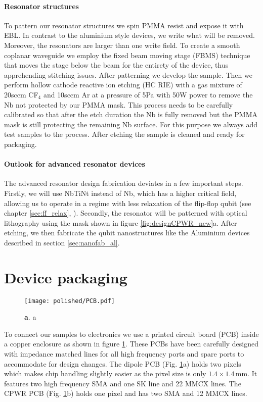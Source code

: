 \paragraph*{Resonator structures}
To pattern our resonator structures we spin PMMA resist and expose it with EBL. In contrast to the aluminium style devices, we write what will be removed. Moreover, the resonators are larger than one write field. To create a smooth coplanar waveguide we employ the fixed beam moving stage (FBMS) technique that moves the stage below the beam for the entirety of the device, thus apprehending stitching issues. After patterning we develop the sample. Then we perform hollow cathode reactive ion etching (HC RIE) with a gas mixture of 20sccm CF$_4$ and 10sccm Ar at a pressure of 5Pa with 50W power to remove the Nb not protected by our PMMA mask. This process needs to be carefully calibrated so that after the etch duration the Nb is fully removed but the PMMA mask is still protecting the remaining Nb surface. For this purpose we always add test samples to the process. After etching the sample is cleaned and ready for packaging. 

\paragraph*{Outlook for advanced resonator devices}
The advanced resonator design fabrication deviates in a few important steps. Firstly, we will use NbTiNt instead of Nb, which has a higher critical field, allowing us to operate in a regime with less relaxation of the flip-flop qubit (see chapter \ref{sec:ff_relax}, \cite{Boross2016}). Secondly, the resonator will be patterned with optical lithography using the mask shown in figure \ref{fig:designCPWR_new}a. After etching, we then fabricate the qubit nanostructures like the Aluminium devices described in section \ref{sec:nanofab_al}. 


\section{Device packaging} \label{sec:packaging}

\begin{figure}
	\centering
	\texttt{[image: polished/PCB.pdf]}
	\caption[PCB]{\textbf{a}. a }
	\label{fig:pcb}
\end{figure}

To connect our samples to electronics we use a printed circuit board (PCB) inside a copper enclosure as shown in figure \ref{fig:pcb}. These PCBs have been carefully designed with impedance matched lines for all high frequency ports and spare ports to accommodate for design changes. The dipole PCB (Fig. \ref{fig:pcb}a) holds two pixels which makes chip handling slightly easier as the pixel size is only $1.4\times1.4\,$mm. It features two high frequency SMA
and one SK line and 22 MMCX lines. The CPWR PCB (Fig. \ref{fig:pcb}b) holds one pixel and has two SMA and 12 MMCX lines. 

